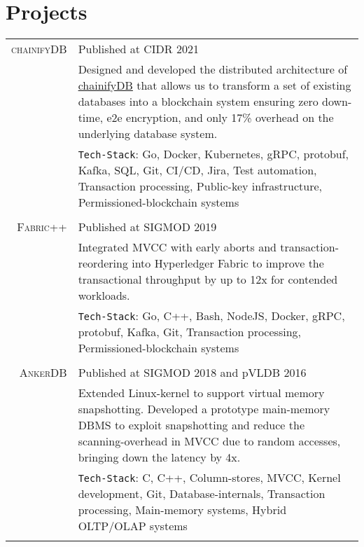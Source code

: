 \documentclass[a4paper,10pt]{article} %
\begin{document}

\section{Projects}
\vspace*{0.2cm}
\begin{tabular}{rp{14.5cm}}
	\textsc{chainifyDB} & Published at CIDR 2021 \\
	& \small{Designed and developed the distributed architecture of \href{www.chainifydb.com}{chainifyDB} that allows us to transform a set of existing databases into a 
		blockchain system ensuring zero down-time, e2e encryption, and only 17\% overhead on the underlying database system.}\\
	& \texttt{Tech-Stack}: Go, Docker, Kubernetes, gRPC, protobuf, Kafka, SQL, Git, CI/CD, Jira, Test automation, Transaction processing, Public-key infrastructure, Permissioned-blockchain systems\\
	\multicolumn{2}{c}{} \\
	
	
	\textsc{Fabric++} & Published at SIGMOD 2019 \\ 
	& \small{Integrated MVCC with early aborts and transaction-reordering into Hyperledger Fabric to improve the transactional throughput by up to 12x for contended workloads.}\\
		& \texttt{Tech-Stack}: Go, C++, Bash, NodeJS, Docker, gRPC, protobuf, Kafka, Git, Transaction processing, Permissioned-blockchain systems\\
	\multicolumn{2}{c}{} \\
	
	
	\textsc{AnkerDB} & Published at SIGMOD 2018 and pVLDB 2016\\
	&\small{Extended Linux-kernel to support virtual memory snapshotting. Developed a prototype main-memory DBMS to exploit snapshotting and reduce the scanning-overhead in MVCC due to random accesses, bringing down the latency by 4x.}\\
		& \texttt{Tech-Stack}: C, C++, Column-stores, MVCC, Kernel development, Git, Database-internals, Transaction processing, Main-memory systems, Hybrid OLTP/OLAP systems\\
	\multicolumn{2}{c}{} \\


\end{tabular}
\end{document}
